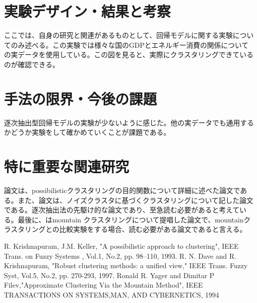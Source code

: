 \documentclass[10pt,onecolumn]{jsarticle}
\begin{document}
\section{実験デザイン・結果と考察}
ここでは、自身の研究と関連があるものとして、回帰モデルに関する実験についてのみ述べる。この実験では様々な国のGDPとエネルギー消費の関係についての実データを使用している。この図を見ると、実際にクラスタリングできているのが確認できる。
\section{手法の限界・今後の課題}
逐次抽出型回帰モデルの実験が少ないように感じた。他の実データでも通用するかどうか実験をして確かめていくことが課題である。
\section{特に重要な関連研究}
論文\cite{ref1}は、possibilisticクラスタリングの目的関数について詳細に述べた論文である。また、論文\cite{ref2}は、ノイズクラスタに基づくクラスタリングについて記した論文である。逐次抽出法の先駆け的な論文であり、至急読む必要があると考えている。最後に、\cite{ref3}はmountain クラスタリングについて提唱した論文で、mountainクラスタリングとの比較実験をする場合、読む必要がある論文であると言える。

\begin{thebibliography}{99}
%
R. Krishnapuram, J.M. Keller, "A possibilistic approach to clustering", IEEE Trans. on Fuzzy Systems , Vol.1, No.2, pp. 98–110, 1993.
%
	R. N. Dave and R. Krishnapuram, "Robust clustering methods: a unified view," IEEE Trans. Fuzzy Syst, Vol.5, No.2, pp. 270-293, 1997.
	Ronald R. Yager and Dimitar P Filev,"Approximate Clustering Via the Mountain Method", IEEE TRANSACTIONS ON SYSTEMS,MAN, AND CYBERNETICS, 1994
\end{thebibliography}



\end{document}
